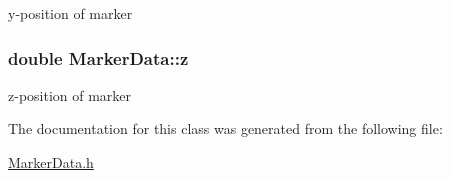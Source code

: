 y-\/position of marker 

\subsubsection[{\texorpdfstring{z}{z}}]{\setlength{\rightskip}{0pt plus 5cm}double Marker\+Data\+::z}\hypertarget{class_marker_data_adc00ff164746747a7b379a94abf8a2df}{}\label{class_marker_data_adc00ff164746747a7b379a94abf8a2df}


z-\/position of marker 



The documentation for this class was generated from the following file\+:\begin{DoxyCompactItemize}
\item 
\hyperlink{_marker_data_8h}{Marker\+Data.\+h}\end{DoxyCompactItemize}
